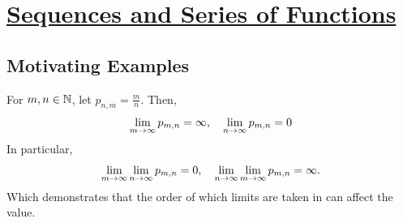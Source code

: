 \section[Sequences and Series of Functions]{\hyperlink{toc}{Sequences and Series of Functions}}

\subsection{Motivating Examples}
\begin{nexample}{}{}
    For $m, n \in \mathbb{N}$, let $p_{n, m} = \frac{m}{n}$. Then, 
    \begin{align*}
        \lim_{m\rightarrow \infty} p_{m, n} = \infty, \quad \lim_{n \rightarrow \infty} p_{m, n} = 0
    \end{align*}
    In particular,
    \begin{align*}
        \lim_{m \rightarrow \infty}\lim_{n \rightarrow \infty} p_{m, n} = 0, \quad \lim_{n \rightarrow \infty}\lim_{m \rightarrow \infty} p_{m, n} = \infty.
    \end{align*}
    Which demonstrates that the order of which limits are taken in can affect the value.
\end{nexample}

